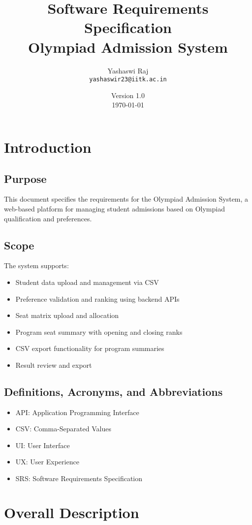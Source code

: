 \documentclass[12pt,a4paper]{article}
\title{Software Requirements Specification\\Olympiad Admission System}
\author{Yashaswi Raj\\\texttt{yashaswir23@iitk.ac.in}}
\date{\normalsize Version 1.0 \\ \today}
\begin{document}
\maketitle

\tableofcontents
\newpage

\section{Introduction}
\subsection{Purpose}
This document specifies the requirements for the Olympiad Admission System, a web-based platform for managing student admissions based on Olympiad qualification and preferences.

\subsection{Scope}
The system supports:
\begin{itemize}
    \item Student data upload and management via CSV
    \item Preference validation and ranking using backend APIs
    \item Seat matrix upload and allocation
    \item Program seat summary with opening and closing ranks
    \item CSV export functionality for program summaries
    \item Result review and export
\end{itemize}

\subsection{Definitions, Acronyms, and Abbreviations}
\begin{itemize}
    \item API: Application Programming Interface
    \item CSV: Comma-Separated Values
    \item UI: User Interface
    \item UX: User Experience
    \item SRS: Software Requirements Specification
\end{itemize}
\newpage
\section{Overall Description}
\end{document}
